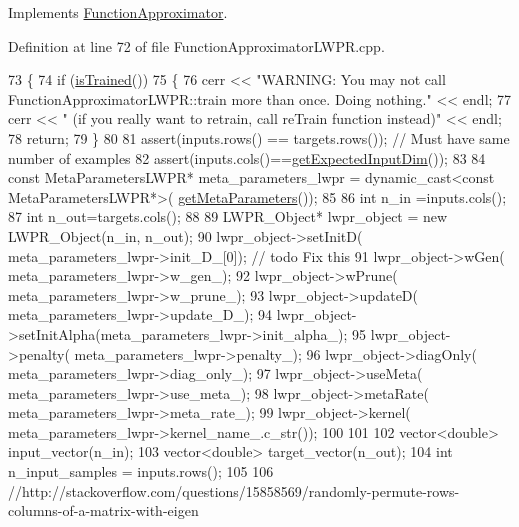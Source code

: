 Implements \hyperlink{classDmpBbo_1_1FunctionApproximator_a9781476c7d296da4aaf50e74cd273a75}{Function\+Approximator}.



Definition at line 72 of file Function\+Approximator\+L\+W\+P\+R.\+cpp.


\begin{DoxyCode}
73 \{
74   \textcolor{keywordflow}{if} (\hyperlink{classDmpBbo_1_1FunctionApproximator_a178135f623d9b9058870851a53299c6e}{isTrained}())  
75   \{
76     cerr << \textcolor{stringliteral}{"WARNING: You may not call FunctionApproximatorLWPR::train more than once. Doing nothing."} << 
      endl;
77     cerr << \textcolor{stringliteral}{"   (if you really want to retrain, call reTrain function instead)"} << endl;
78     \textcolor{keywordflow}{return};
79   \}
80   
81   assert(inputs.rows() == targets.rows()); \textcolor{comment}{// Must have same number of examples}
82   assert(inputs.cols()==\hyperlink{classDmpBbo_1_1FunctionApproximator_af5a550bcf65d5a29a153a594cc4e3fa1}{getExpectedInputDim}());
83   
84   \textcolor{keyword}{const} MetaParametersLWPR* meta\_parameters\_lwpr = \textcolor{keyword}{dynamic\_cast<}\textcolor{keyword}{const }MetaParametersLWPR*\textcolor{keyword}{>}(
      \hyperlink{classDmpBbo_1_1FunctionApproximator_a6f1a44062eac61d88b647c358bcda155}{getMetaParameters}());
85   
86   \textcolor{keywordtype}{int} n\_in =inputs.cols();
87   \textcolor{keywordtype}{int} n\_out=targets.cols();
88  
89   LWPR\_Object* lwpr\_object = \textcolor{keyword}{new} LWPR\_Object(n\_in, n\_out);
90         lwpr\_object->setInitD(    meta\_parameters\_lwpr->init\_D\_[0]); \textcolor{comment}{// todo Fix this}
91         lwpr\_object->wGen(        meta\_parameters\_lwpr->w\_gen\_);
92   lwpr\_object->wPrune(      meta\_parameters\_lwpr->w\_prune\_);
93   lwpr\_object->updateD(     meta\_parameters\_lwpr->update\_D\_);
94   lwpr\_object->setInitAlpha(meta\_parameters\_lwpr->init\_alpha\_);
95   lwpr\_object->penalty(     meta\_parameters\_lwpr->penalty\_);
96         lwpr\_object->diagOnly(    meta\_parameters\_lwpr->diag\_only\_);
97   lwpr\_object->useMeta(     meta\_parameters\_lwpr->use\_meta\_);
98   lwpr\_object->metaRate(    meta\_parameters\_lwpr->meta\_rate\_);
99   lwpr\_object->kernel(      meta\_parameters\_lwpr->kernel\_name\_.c\_str());
100    
101   
102   vector<double> input\_vector(n\_in);
103   vector<double> target\_vector(n\_out);
104   \textcolor{keywordtype}{int} n\_input\_samples = inputs.rows();
105   
106   \textcolor{comment}{//http://stackoverflow.com/questions/15858569/randomly-permute-rows-columns-of-a-matrix-with-eigen}

\end{DoxyCode}
